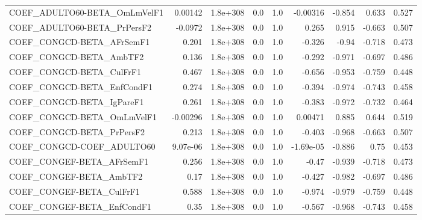 \begin{tabular}{lrrrrrrrr}
COEF\_ADULTO60-BETA\_OmLmVelF1          &     0.00142 &     1.8e+308 &     0.0 &      1.0 &   -0.00316 &      -0.854 &        0.633 &         0.527 \\
COEF\_ADULTO60-BETA\_PrPersF2           &     -0.0972 &     1.8e+308 &     0.0 &      1.0 &      0.265 &       0.915 &       -0.663 &         0.507 \\
COEF\_CONGCD-BETA\_AFrSemF1             &       0.201 &     1.8e+308 &     0.0 &      1.0 &     -0.326 &       -0.94 &       -0.718 &         0.473 \\
COEF\_CONGCD-BETA\_AmbTF2               &       0.136 &     1.8e+308 &     0.0 &      1.0 &     -0.292 &      -0.971 &       -0.697 &         0.486 \\
COEF\_CONGCD-BETA\_CulFrF1              &       0.467 &     1.8e+308 &     0.0 &      1.0 &     -0.656 &      -0.953 &       -0.759 &         0.448 \\
COEF\_CONGCD-BETA\_EnfCondF1            &       0.274 &     1.8e+308 &     0.0 &      1.0 &     -0.394 &      -0.974 &       -0.743 &         0.458 \\
COEF\_CONGCD-BETA\_IgPareF1             &       0.261 &     1.8e+308 &     0.0 &      1.0 &     -0.383 &      -0.972 &       -0.732 &         0.464 \\
COEF\_CONGCD-BETA\_OmLmVelF1            &    -0.00296 &     1.8e+308 &     0.0 &      1.0 &    0.00471 &       0.885 &        0.644 &         0.519 \\
COEF\_CONGCD-BETA\_PrPersF2             &       0.213 &     1.8e+308 &     0.0 &      1.0 &     -0.403 &      -0.968 &       -0.663 &         0.507 \\
COEF\_CONGCD-COEF\_ADULTO60             &    9.07e-06 &     1.8e+308 &     0.0 &      1.0 &  -1.69e-05 &      -0.886 &         0.75 &         0.453 \\
COEF\_CONGEF-BETA\_AFrSemF1             &       0.256 &     1.8e+308 &     0.0 &      1.0 &      -0.47 &      -0.939 &       -0.718 &         0.473 \\
COEF\_CONGEF-BETA\_AmbTF2               &        0.17 &     1.8e+308 &     0.0 &      1.0 &     -0.427 &      -0.982 &       -0.697 &         0.486 \\
COEF\_CONGEF-BETA\_CulFrF1              &       0.588 &     1.8e+308 &     0.0 &      1.0 &     -0.974 &      -0.979 &       -0.759 &         0.448 \\
COEF\_CONGEF-BETA\_EnfCondF1            &        0.35 &     1.8e+308 &     0.0 &      1.0 &     -0.567 &      -0.968 &       -0.743 &         0.458 \\

\end{tabular}
